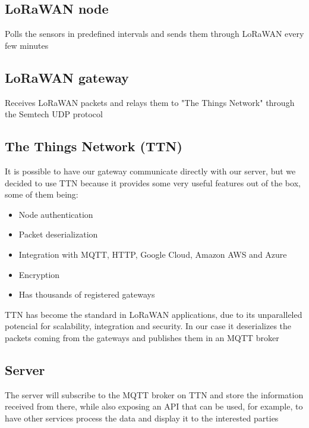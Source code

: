 	\subsection{LoRaWAN node}
		Polls the sensors in predefined intervals and sends them through LoRaWAN every few minutes

	\subsection{LoRaWAN gateway}
		Receives LoRaWAN packets and relays them to "The Things Network" through the Semtech UDP protocol

	\subsection{The Things Network (TTN)}\label{ttn_description}
		It is possible to have our gateway communicate directly with our server, but we decided to use TTN because it provides some very useful features out of the box, some of them being:

		\begin{itemize}
			\item Node authentication
			\item Packet deserialization
			\item Integration with MQTT, HTTP, Google Cloud, Amazon AWS and Azure
			\item Encryption
			\item Has thousands of registered gateways
		\end{itemize}

		TTN has become the standard in LoRaWAN applications, due to its unparalleled potencial for scalability, integration and security. In our case it deserializes the packets coming from the gateways and publishes them in an MQTT broker 

	\subsection{Server}
		The server will subscribe to the MQTT broker on TTN and store the information received from there, while also exposing an API that can be used, for example, to have other services process the data and display it to the interested parties
	
